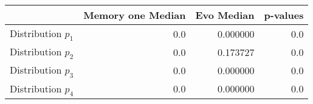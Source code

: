 \begin{tabular}{lrrr}
\toprule
{} &  Memory one Median &  Evo Median &  p-values \\
\midrule
Distribution $p_1$ &                0.0 &    0.000000 &       0.0 \\
Distribution $p_2$ &                0.0 &    0.173727 &       0.0 \\
Distribution $p_3$ &                0.0 &    0.000000 &       0.0 \\
Distribution $p_4$ &                0.0 &    0.000000 &       0.0 \\
\bottomrule
\end{tabular}
